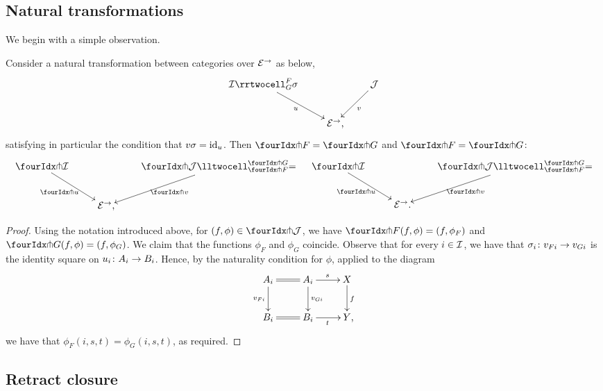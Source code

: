 \documentclass[reqno,10pt,a4paper,oneside,draft]{amsart}
\begin{document}
\subsection*{Natural transformations}

We begin with a simple observation.

\begin{proposition} \label{thm:orth-nat}
Consider a natural transformation between categories over $\catE^\to$ as below,
\[
\xymatrix{
  \cal{I}
  \rrtwocell_G^F{\sigma}
 \ar[dr]_{u}
&&
  \cal{J}
  \ar[dl]^{v}
\\&
  \catE^\to
\rlap{,}}
\]
satisfying in particular the condition that $v \sigma = \id_u$.
Then $\liftr{F} = \liftr{G}$ and $\liftl{F} = \liftl{G}$:
\begin{align*}
\xymatrix{
  \liftr{\cal{I}}
  \ar[dr]_{\liftr{u}}
&&
  \liftr{\cal{J}}
  \lltwocell_{\liftr{F}}^{\liftr{G}}{=}
  \ar[dl]^{\liftr{v}}
\\&
  \catE^\to
\rlap{,}}
&&
\xymatrix{
  \liftl{\cal{I}}
  \ar[dr]_{\liftl{u}}
&&
  \liftl{\cal{J}}
  \lltwocell_{\liftl{F}}^{\liftl{G}}{=}
  \ar[dl]^{\liftl{v}}
\\&
  \catE^\to
\rlap{.}}
\end{align*}
\end{proposition}

\begin{proof} Using the notation introduced above, for $(f, \phi) \in \liftr{\cal{J}}$, we have $\liftr{F}(f, \phi) = (f, \phi_F)$ and~$\liftr{G}(f, \phi) = (f, \phi_G)$.
We claim that the functions $\phi_F$ and $\phi_G$ coincide.
Observe that for every $i \in \cal{I}$, we have that $\sigma_i \co v_{Fi} \to v_{Gi}$ is the identity square on $u_i \co A_i \to B_i$.
Hence, by the naturality condition for $\phi$, applied to the diagram
\[
\xymatrix{
  A_i
  \ar@{=}[r]
  \ar[d]_{v_{Fi}}
&
  A_i
  \ar[d]^{v_{Gi}}
  \ar[r]^{s}
&
  X
  \ar[d]^{f}
\\
  B_i
  \ar@{=}[r]
&
  B_i
  \ar[r]_{t}
&
  Y
\rlap{,}}
\]
we have that $\phi_F(i, s, t) = \phi_G(i, s, t)$, as required.
\end{proof}

\subsection*{Retract closure}
\end{document}
